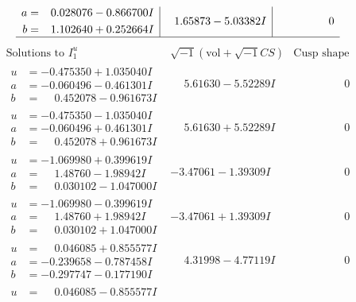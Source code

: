 \documentclass[1p]{elsarticle_modified}
\theoremstyle{definition}
\newcommand{\I}{\sqrt{-1}}
\begin{document}
$$\begin{array}{c|c|c}
\begin{aligned}
a &= \phantom{-}0.028076 - 0.866700 I \\
b &= \phantom{-}1.102640 + 0.252664 I\end{aligned}
 & \phantom{-}1.65873 - 5.03382 I & \phantom{-0.000000 } 0\\
 \hline 
 \end{array}$$\newpage$$\begin{array}{c|c|c}  
\text{Solutions to }I^u_{1}& \I (\text{vol} + \sqrt{-1}CS) & \text{Cusp shape}\\
 \hline 
\begin{aligned}
u &= -0.475350 + 1.035040 I \\
a &= -0.060496 - 0.461301 I \\
b &= \phantom{-}0.452078 - 0.961673 I\end{aligned}
 & \phantom{-}5.61630 - 5.52289 I & \phantom{-0.000000 } 0 \\ \hline\begin{aligned}
u &= -0.475350 - 1.035040 I \\
a &= -0.060496 + 0.461301 I \\
b &= \phantom{-}0.452078 + 0.961673 I\end{aligned}
 & \phantom{-}5.61630 + 5.52289 I & \phantom{-0.000000 } 0 \\ \hline\begin{aligned}
u &= -1.069980 + 0.399619 I \\
a &= \phantom{-}1.48760 - 1.98942 I \\
b &= \phantom{-}0.030102 - 1.047000 I\end{aligned}
 & -3.47061 - 1.39309 I & \phantom{-0.000000 } 0 \\ \hline\begin{aligned}
u &= -1.069980 - 0.399619 I \\
a &= \phantom{-}1.48760 + 1.98942 I \\
b &= \phantom{-}0.030102 + 1.047000 I\end{aligned}
 & -3.47061 + 1.39309 I & \phantom{-0.000000 } 0 \\ \hline\begin{aligned}
u &= \phantom{-}0.046085 + 0.855577 I \\
a &= -0.239658 - 0.787458 I \\
b &= -0.297747 - 0.177190 I\end{aligned}
 & \phantom{-}4.31998 - 4.77119 I & \phantom{-0.000000 } 0 \\ \hline\begin{aligned}
u &= \phantom{-}0.046085 - 0.855577 I \\

\end{aligned}
\end{array}$$
\end{document}
